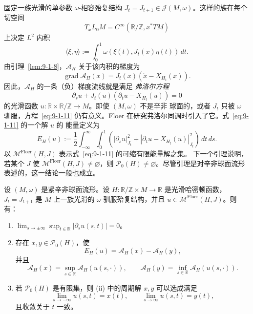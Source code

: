 固定一族光滑的单参数 $\omega$-相容殆复结构
$J_t=J_{t+1}\in\mathcal J(M,\omega)$。这样的族在每个切空间
\[
  T_xL_0M=C^\infty(\mathbb R/\mathbb Z,x^*TM)
\]
上决定 $L^2$ 内积
\[
  \langle\xi,\eta\rangle
  :=\int_0^1\omega(\xi(t),J_t(x)\eta(t))\,dt.
\]
由引理~\ref{lem:9-1-8}，$\mathcal A_H$ 关于该内积的梯度为
\[
  \operatorname{grad}\mathcal A_H(x)
  =J_t(x)(\dot x-X_{H_t}(x)).
\]
因此，$\mathcal A_H$ 的一条（负）梯度流线就是满足 \emph{弗洛尔方程}
\begin{equation}\label{eq:9-1-11}
  \partial_su+J_t(u)(\partial_tu-X_{H_t}(u))=0
\end{equation}
的光滑函数 $u:\mathbb R\times\mathbb R/\mathbb Z\to M$。即使 $(M,\omega)$ 不是辛非
球面的，或者 $J_t$ 只被 $\omega$ 驯服，方程~\eqref{eq:9-1-11} 仍有意义。Floer
 在研究弗洛尔同调时引入了它。式~\eqref{eq:9-1-11} 的一个解 $u$ 的
能量定义为
\[
  E_H(u):=\frac12\int_{-\infty}^{\infty}\int_0^1
  \left(|\partial_su|_{J_t}^2
  +|\partial_tu-X_{H_t}(u)|_{J_t}^2\right)\,dt\,ds.
\]
以 $\mathcal M^{\mathrm{Floer}}(H,J)$ 表示式~\eqref{eq:9-1-11} 的可缩有限能量解之集。
下一个引理说明，若某个 $J$ 使 $\mathcal M^{\mathrm{Floer}}(H,J)\ne\varnothing$，则
$\mathcal P_0(H)\ne\varnothing$。尽管引理是对辛非球面流形表述的，这一结论一般也成立。

\begin{lemma}\label{lem:9-1-12}
设 $(M,\omega)$ 是紧辛非球面流形。设
$H:\mathbb R/\mathbb Z\times M\to\mathbb R$ 是光滑哈密顿函数，
$J_t=J_{t+1}$ 是 $M$ 上一族光滑的 $\omega$-驯服殆复结构，并且
$u\in\mathcal M^{\mathrm{Floer}}(H,J)$。则有：
\begin{enumerate}[label=\textnormal{(\roman*)}]
\item $\displaystyle\lim_{s\to\pm\infty}\sup_{t\in\mathbb R}
|\partial_su(s,t)|=0$。

\item 存在 $x,y\in\mathcal P_0(H)$，使
\[
  E_H(u)=\mathcal A_H(x)-\mathcal A_H(y),
\]
并且
\[
  \mathcal A_H(x)=\sup_{s\in\mathbb R}\mathcal A_H(u(s,\cdot)),
  \qquad
  \mathcal A_H(y)=\inf_{s\in\mathbb R}\mathcal A_H(u(s,\cdot)).
\]

\item 若 $\mathcal P_0(H)$ 是有限集，则 (ii) 中的周期解 $x,y$ 可以选成满足
\[
  \lim_{s\to-\infty}u(s,t)=x(t),
  \qquad
  \lim_{s\to\infty}u(s,t)=y(t),
\]
且收敛关于 $t$ 一致。
\end{enumerate}
\end{lemma}

